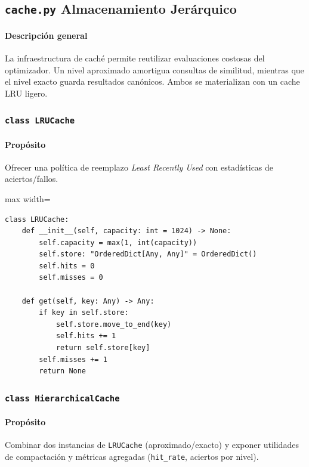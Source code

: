 \subsection{\texttt{cache.py} \- Almacenamiento Jerárquico}
\paragraph{Descripción general}
La infraestructura de caché permite reutilizar evaluaciones costosas del optimizador. Un nivel aproximado amortigua consultas de similitud, mientras que el nivel exacto guarda resultados canónicos. Ambos se materializan con un cache LRU ligero.

\subsubsection{\texttt{class LRUCache}}
\paragraph{Propósito} Ofrecer una política de reemplazo \emph{Least Recently Used} con estadísticas de aciertos/fallos.

\begin{listing}[H]
\caption{Métodos clave de \texttt{LRUCache}}
\begin{adjustbox}{max width=\textwidth}
\begin{minipage}{\textwidth}
\begin{verbatim}
class LRUCache:
    def __init__(self, capacity: int = 1024) -> None:
        self.capacity = max(1, int(capacity))
        self.store: "OrderedDict[Any, Any]" = OrderedDict()
        self.hits = 0
        self.misses = 0

    def get(self, key: Any) -> Any:
        if key in self.store:
            self.store.move_to_end(key)
            self.hits += 1
            return self.store[key]
        self.misses += 1
        return None
\end{verbatim}
\end{minipage}
\end{adjustbox}
\end{listing}

\subsubsection{\texttt{class HierarchicalCache}}
\paragraph{Propósito} Combinar dos instancias de \texttt{LRUCache} (aproximado/exacto) y exponer utilidades de compactación y métricas agregadas (\texttt{hit\_rate}, aciertos por nivel).

